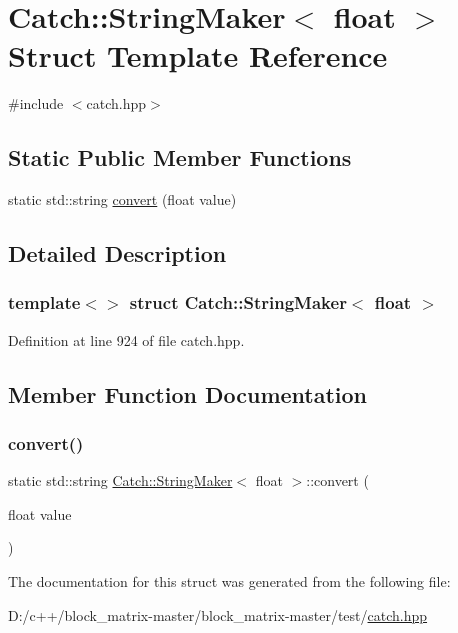 \hypertarget{struct_catch_1_1_string_maker_3_01float_01_4}{}\section{Catch\+:\+:String\+Maker$<$ float $>$ Struct Template Reference}
\label{struct_catch_1_1_string_maker_3_01float_01_4}


{\ttfamily \#include $<$catch.\+hpp$>$}

\subsection*{Static Public Member Functions}
\begin{DoxyCompactItemize}
\item 
static std\+::string \mbox{\hyperlink{struct_catch_1_1_string_maker_3_01float_01_4_a7ffacc6fa46a338200f3fbb2ee078648}{convert}} (float value)
\end{DoxyCompactItemize}


\subsection{Detailed Description}
\subsubsection*{template$<$$>$\newline
struct Catch\+::\+String\+Maker$<$ float $>$}



Definition at line 924 of file catch.\+hpp.



\subsection{Member Function Documentation}
\mbox{\label{struct_catch_1_1_string_maker_3_01float_01_4_a7ffacc6fa46a338200f3fbb2ee078648}} 
\subsubsection{\texorpdfstring{convert()}{convert()}}
{\footnotesize\ttfamily static std\+::string \mbox{\hyperlink{struct_catch_1_1_string_maker}{Catch\+::\+String\+Maker}}$<$ float $>$\+::convert (\begin{DoxyParamCaption}\item[{float}]{value }\end{DoxyParamCaption})\hspace{0.3cm}{\ttfamily [static]}}



The documentation for this struct was generated from the following file\+:\begin{DoxyCompactItemize}
\item 
D\+:/c++/block\+\_\+matrix-\/master/block\+\_\+matrix-\/master/test/\mbox{\hyperlink{catch_8hpp}{catch.\+hpp}}\end{DoxyCompactItemize}
